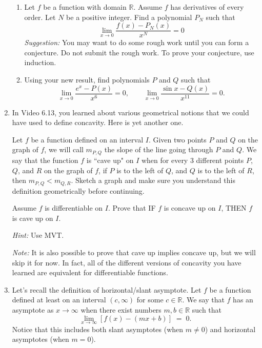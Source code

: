 \documentclass[12pt]{exam}
\newcommand {\DS} [1] {${\displaystyle #1}$}
\newcommand{\vv}{\vspace{.1cm}}
\newcommand{\R}{\mathbb{R}}
\begin{document}
\begin{enumerate}
\begin{enumerate}
			
		\item  Let $f$ be a function with domain $\R$.  Assume $f$ has derivatives of every order.   Let $N$ be a positive integer.  Find a polynomial \DS{P_N} such that
			$$
				\lim_{x \to 0} \frac{f(x) - P_N(x)}{x^N} = 0
			$$
			\emph{Suggestion:} You may want to do some rough work until you can form a conjecture.    Do not submit the rough work.  To prove your conjecture, use induction.
		\item  Using your new result, find polynomials $P$  and $Q$ such that
			$$
				\lim_{x \to 0} \frac{e^x - P(x)}{x^6} = 0, \quad \quad \lim_{x \to 0} \frac{\sin x - Q(x)}{x^{11}} = 0.
			$$
	\end{enumerate}

\vv

\item  In Video 6.13, you learned about various geometrical notions that we could have used to define concavity.  Here is yet another one.

 Let $f$ be a function defined on an interval $I$.  Given two points $P$ and $Q$ on the graph of $f$, we will call $m_{P,Q}$ the slope of the line going through $P$ and $Q$.  We say that the function $f$ is ``cave up" on $I$ when for every 3 different points $P$, $Q$, and $R$ on the graph of $f$, if $P$ is to the left of $Q$, and $Q$ is to the left of $R$, then $m_{P,Q} < m_{Q,R}$.  Sketch a graph and make sure you understand this definition geometrically  before continuing.
 
 Assume $f$ is differentiable on $I$. 
		Prove that IF $f$ is concave up on $I$, THEN $f$ is cave up on $I$.


\emph{Hint:}  Use MVT.

\emph{Note:}  It is also possible to prove that cave up implies concave up, but we will skip it for now.  In fact, all of the different versions of concavity you have learned are equivalent for differentiable functions.	

\vv

\item  Let's recall the definition of horizontal/slant asymptote.  Let $f$ be a function defined at least on an interval $(c,\infty)$ for some $c \in \R$.
We say that $f$ has an asymptote as $x \to \infty$ when there exist numbers $m, b \in \R$ such that
	$$	
		\lim_{x \to \infty} \left[ f(x) - \left( mx + b \right) \right] \; = \; 0.
	$$
Notice that this includes both slant asymptotes (when $m \neq 0$) and horizontal asymptotes (when $m =0$).
	

\end{enumerate}
\end{document}
